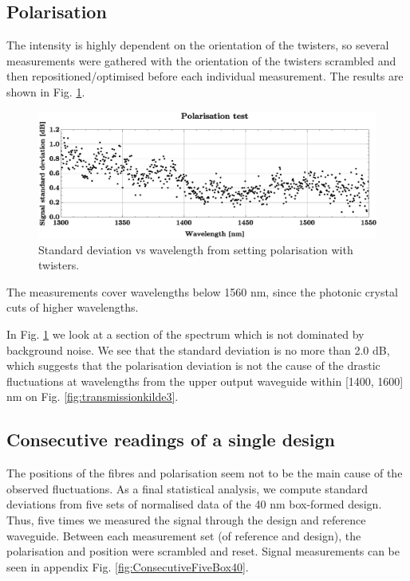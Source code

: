 \subsection{Polarisation}

The intensity is highly dependent on the orientation of the twisters, so several measurements were gathered with the orientation of the twisters scrambled and then repositioned/optimised before each individual measurement. The results are shown in Fig. \ref{fig:PolarisationError}. \\

\begin{figure}[h!]
    \centering  
    \includegraphics[width=\textwidth]{fig/statistics/polarisationtest2.eps}
    \caption{Standard deviation vs wavelength from setting polarisation with twisters.}
    \label{fig:PolarisationError}
\end{figure}

The measurements cover wavelengths below 1560 nm, since the photonic crystal cuts of higher wavelengths.

In Fig. \ref{fig:PolarisationError} we look at a section of the spectrum which is not dominated by background noise. We see that the standard deviation is no more than 2.0 dB, which suggests that the polarisation deviation is not the cause of the drastic fluctuations at wavelengths from the upper output waveguide within [1400, 1600] nm on Fig. \ref{fig:transmissionkilde3}.

\subsection{Consecutive readings of a single design}

The positions of the fibres and polarisation seem not to be the main cause of the observed fluctuations. As a final statistical analysis, we compute standard deviations from five sets of normalised data of the 40 nm box-formed design. Thus, five times we measured the signal through the design and reference waveguide.  Between each measurement set (of reference and design), the polarisation and position were scrambled and reset. Signal measurements can be seen in appendix Fig. \ref{fig:ConsecutiveFiveBox40}.

